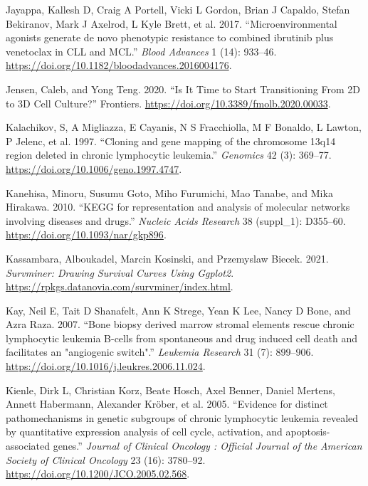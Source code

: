 \documentclass[11pt, a4paper, twosided]{book}
\newenvironment{CSLReferences}%
  {}%
  {\par}
\begin{document}
\begin{CSLReferences}{1}{0}
\leavevmode{}%
Jayappa, Kallesh D, Craig A Portell, Vicki L Gordon, Brian J Capaldo, Stefan Bekiranov, Mark J Axelrod, L Kyle Brett, et al. 2017. {``{Microenvironmental agonists generate de novo phenotypic resistance to combined ibrutinib plus venetoclax in CLL and MCL}.''} \emph{Blood Advances} 1 (14): 933--46. \url{https://doi.org/10.1182/bloodadvances.2016004176}.

\leavevmode{}%
Jensen, Caleb, and Yong Teng. 2020. {``{Is It Time to Start Transitioning From 2D to 3D Cell Culture?}''} Frontiers. \url{https://doi.org/10.3389/fmolb.2020.00033}.

\leavevmode{}%
Kalachikov, S, A Migliazza, E Cayanis, N S Fracchiolla, M F Bonaldo, L Lawton, P Jelenc, et al. 1997. {``{Cloning and gene mapping of the chromosome 13q14 region deleted in chronic lymphocytic leukemia}.''} \emph{Genomics} 42 (3): 369--77. \url{https://doi.org/10.1006/geno.1997.4747}.

\leavevmode{}%
Kanehisa, Minoru, Susumu Goto, Miho Furumichi, Mao Tanabe, and Mika Hirakawa. 2010. {``{KEGG for representation and analysis of molecular networks involving diseases and drugs}.''} \emph{Nucleic Acids Research} 38 (suppl\_1): D355--60. \url{https://doi.org/10.1093/nar/gkp896}.

\leavevmode{}%
Kassambara, Alboukadel, Marcin Kosinski, and Przemyslaw Biecek. 2021. \emph{Survminer: Drawing Survival Curves Using Ggplot2}. \url{https://rpkgs.datanovia.com/survminer/index.html}.

\leavevmode{}%
Kay, Neil E, Tait D Shanafelt, Ann K Strege, Yean K Lee, Nancy D Bone, and Azra Raza. 2007. {``{Bone biopsy derived marrow stromal elements rescue chronic lymphocytic leukemia B-cells from spontaneous and drug induced cell death and facilitates an "angiogenic switch"}.''} \emph{Leukemia Research} 31 (7): 899--906. \url{https://doi.org/10.1016/j.leukres.2006.11.024}.

\leavevmode{}%
Kienle, Dirk L, Christian Korz, Beate Hosch, Axel Benner, Daniel Mertens, Annett Habermann, Alexander Kröber, et al. 2005. {``{Evidence for distinct pathomechanisms in genetic subgroups of chronic lymphocytic leukemia revealed by quantitative expression analysis of cell cycle, activation, and apoptosis-associated genes.}''} \emph{Journal of Clinical Oncology : Official Journal of the American Society of Clinical Oncology} 23 (16): 3780--92. \url{https://doi.org/10.1200/JCO.2005.02.568}.


\end{CSLReferences}
\end{document}
